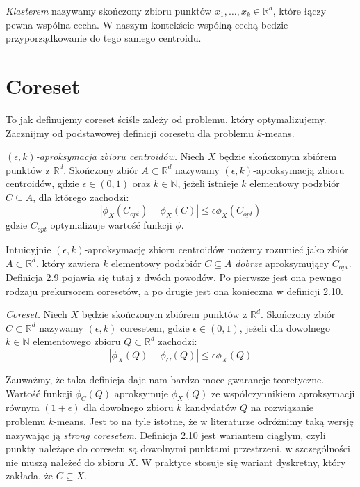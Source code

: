 \begin{definition}
    \emph{Klasterem} nazywamy skończony zbioru punktów $x_{1}, \dots, x_{k} \in \mathbb{R}^{d}$, które łączy pewna wspólna cecha.
    W naszym kontekście wspólną cechą bedzie przyporządkowanie do tego samego centroidu.
\end{definition}

\section{Coreset}

To jak definujemy coreset ściśle zależy od problemu, który optymalizujemy.
Zacznijmy od podstawowej definicji coresetu dla problemu $k$-means.

\begin{definition}
    \emph{$(\epsilon, k)$-aproksymacja zbioru centroidów.} 
    Niech $X$ będzie skończonym zbiórem punktów z $\mathbb{R}^{d}$.
    Skończony zbiór $A \subset \mathbb{R}^{d}$ nazywamy $(\epsilon, k)$-aproksymacją zbioru centroidów, gdzie $\epsilon \in (0, 1)$ oraz $k \in \mathbb{N}$, jeżeli istnieje $k$ elementowy podzbiór $C \subseteq A$, dla którego zachodzi:
    \begin{equation}
        |\phi_{X}(C_{opt}) - \phi_{X}(C)| \leq \epsilon\phi_{X}(C_{opt})
    \end{equation}
    gdzie $C_{opt}$ optymalizuje wartość funkcji $\phi$.
\end{definition}

\noindent
Intuicyjnie $(\epsilon, k)$-aproksymację zbioru centroidów możemy rozumieć jako zbiór $A \subset \mathbb{R}^{d}$, który zawiera $k$ elementowy podzbiór $C \subseteq A$ \textit{dobrze} aproksymujący $C_{opt}$.
Definicja 2.9 pojawia się tutaj z dwóch powodów.
Po pierwsze jest ona pewngo rodzaju prekursorem coresetów, a po drugie jest ona konieczna w definicji 2.10.

\begin{definition}
    \emph{Coreset.} Niech $X$ będzie skończonym zbiórem punktów z $\mathbb{R}^{d}$.
    Skończony zbiór $C \subset \mathbb{R}^{d}$ nazywamy $(\epsilon, k)$ coresetem, gdzie $\epsilon \in (0, 1)$, jeżeli dla dowolnego $k \in \mathbb{N}$ elementowego zbioru $Q \subset \mathbb{R}^{d}$ zachodzi:
    \begin{equation}
        |\phi_{X}(Q) - \phi_{C}(Q)| \leq \epsilon\phi_{X}(Q)
    \end{equation}
\end{definition}

\noindent
Zauważmy, że taka definicja daje nam bardzo moce gwarancje teoretyczne.
Wartość funkcji $\phi_{C}(Q)$ aproksymuje $\phi_{X}(Q)$ ze współczynnikiem aproksymacji równym $(1+\epsilon)$ dla dowolnego zbioru $k$ kandydatów $Q$ na rozwiązanie problemu $k$-means.
Jest to na tyle istotne, że w literaturze odróżnimy taką wersję nazywając ją \textit{strong coresetem}.
Definicja 2.10 jest wariantem ciągłym, czyli punkty należące do coresetu są dowolnymi punktami przestrzeni, w szczególności nie muszą należeć do zbioru $X$.
W praktyce stosuje się wariant dyskretny, który zakłada, że $C \subseteq X$.

